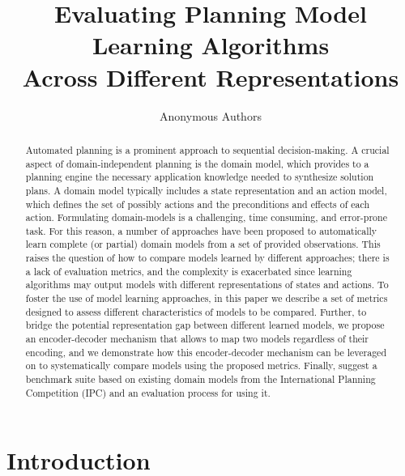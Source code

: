 \documentclass{article}
\title{Evaluating Planning Model Learning Algorithms \\ Across Different Representations}
\author{Anonymous Authors}
\theoremstyle{definition}
\theoremstyle{remark}
\begin{document}
\maketitle

\begin{abstract}
Automated planning is a prominent approach to sequential decision-making. A crucial aspect of domain-independent planning is the domain model, which provides to a planning engine the necessary application knowledge needed to synthesize solution plans. A domain model typically includes a state representation and an action model, which defines the set of possibly actions and the preconditions and effects of each action. 
Formulating domain-models is a challenging, time consuming, and error-prone task. For this reason, a number of approaches have been proposed to automatically learn complete (or partial) domain models from a set of provided observations. This raises the question of how to compare models learned by different approaches; there is a lack of evaluation metrics, and the complexity is exacerbated since learning algorithms may output models with different representations of states and actions. 
To foster the use of model learning approaches, in this paper we describe a set of metrics designed to assess different characteristics of models to be compared. Further, to bridge the potential representation gap between different learned models, we propose an encoder-decoder mechanism that allows to map two models regardless of their encoding, and we demonstrate how this encoder-decoder mechanism can be leveraged on to systematically compare models using the proposed metrics. Finally, suggest a benchmark suite based on existing domain models from the International Planning Competition (IPC) and an evaluation process for using it. 
\end{abstract}

\section{Introduction}
\end{document}
